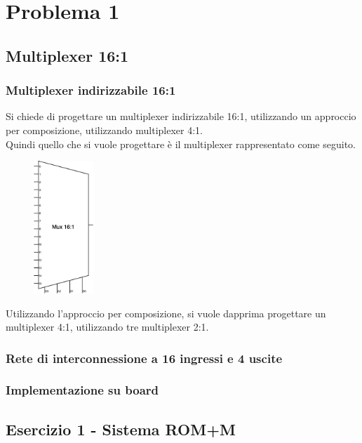 \chapter{Problema 1}

\section{Multiplexer 16:1}

\subsection{Multiplexer indirizzabile 16:1}
Si chiede di progettare un multiplexer indirizzabile 16:1, utilizzando un approccio per composizione, utilizzando multiplexer 4:1.\\
Quindi quello che si vuole progettare è il multiplexer rappresentato come seguito.
\begin{figure}[H]
	\centering
	\includegraphics[width=0.2\textwidth]{img/01}
	\label{01} 
\end{figure}
Utilizzando l'approccio per composizione, si vuole dapprima progettare un multiplexer 4:1, utilizzando tre multiplexer 2:1.


\subsection{Rete di interconnessione a 16 ingressi e 4 uscite}

\subsection{Implementazione su board}

\section{Esercizio 1 - Sistema ROM+M}
